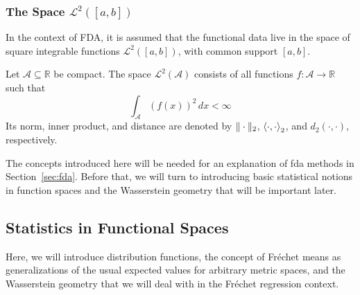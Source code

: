 \subsubsection{The Space $\mathcal{L}^2([a, b])$}
\label{sec:l2 space}
In the context of FDA, it is assumed that the functional data live in
the space of square integrable functions $\mathcal{L}^2([a,b])$, with common
support $[a,b]$.
\begin{definition}
    Let $\mathcal{A} \subseteq \mathbb{R}$ be compact. The space \( \mathcal{L}^2(\mathcal{A}) \)
    consists of all functions \( f: \mathcal{A} \to \mathbb{R} \) such that
    \[
    \int_{\mathcal{A}} (f(x))^2 \, dx < \infty
    \]
    Its norm, inner product, and distance are denoted by $\|\cdot\|_2$,
    $\left \langle \cdot, \cdot \right \rangle_2$, and $d_2(\cdot, \cdot)$, respectively.
\end{definition}
The concepts introduced here will be needed for an explanation of fda methods in Section~\ref{sec:fda}.
Before that, we will turn to introducing basic statistical notions in function spaces
and the Wasserstein geometry that will be important later.

\subsection{Statistics in Functional Spaces}
\label{sec:stat_foundations}
Here, we will introduce distribution functions, the concept of Fréchet means as generalizations
of the usual expected values for arbitrary metric spaces, and the Wasserstein geometry
that we will deal with in the Fréchet regression context.

